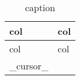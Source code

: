 \begin{landscape}
  \begin{table}[htbp]
  \caption{caption}
  \begin{center}
  \label{tab:{{_var_:label}}}
  \begin{tabular}{p{6cm}p{12cm}}
  \hline
  col & col \\ \hline \hline
  col & col \\ \hline
  {{_cursor_}}
  \end{tabular}
  \end{center}
  \end{table}
\end{landscape}
